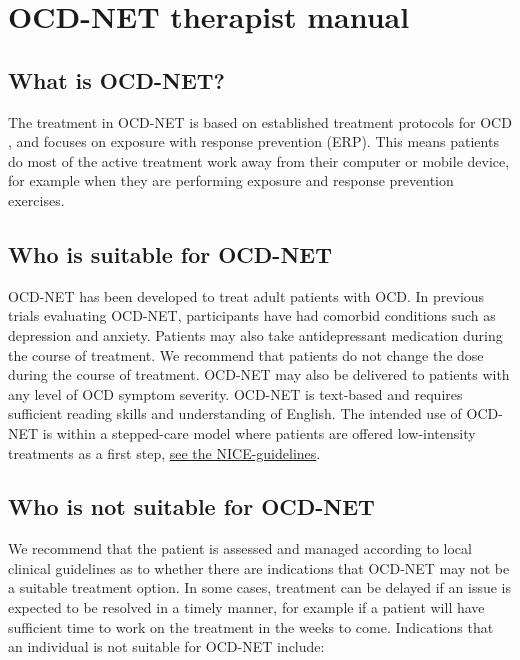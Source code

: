 \documentclass[]{book}
\begin{document}
\hypertarget{ocd-net-therapist-manual}{%
\chapter{OCD-NET therapist manual}\label{ocd-net-therapist-manual}}

\hypertarget{what-is-ocd-net}{%
\section{What is OCD-NET?}\label{what-is-ocd-net}}

The treatment in OCD-NET is based on established treatment protocols for OCD \citep{foa2012}, and focuses on exposure with response prevention (ERP). This means patients do most of the active treatment work away from their computer or mobile device, for example when they are performing exposure and response prevention exercises.

\hypertarget{who-is-suitable-for-ocd-net}{%
\section{Who is suitable for OCD-NET}\label{who-is-suitable-for-ocd-net}}

OCD-NET has been developed to treat adult patients with OCD. In previous trials evaluating OCD-NET, participants have had comorbid conditions such as depression and anxiety. Patients may also take antidepressant medication during the course of treatment. We recommend that patients do not change the dose during the course of treatment. OCD-NET may also be delivered to patients with any level of OCD symptom severity. OCD-NET is text-based and requires sufficient reading skills and understanding of English. The intended use of OCD-NET is within a stepped-care model where patients are offered low-intensity treatments as a first step, \href{https://www.nice.org.uk/guidance/CG31/chapter/1-Guidance\#stepped-care-for-adults-young-people-and-children-with-ocd-or-bdd}{see the NICE-guidelines}.

\hypertarget{who-is-not-suitable-for-ocd-net}{%
\section{Who is not suitable for OCD-NET}\label{who-is-not-suitable-for-ocd-net}}

We recommend that the patient is assessed and managed according to local clinical guidelines as to whether there are indications that OCD-NET may not be a suitable treatment option. In some cases, treatment can be delayed if an issue is expected to be resolved in a timely manner, for example if a patient will have sufficient time to work on the treatment in the weeks to come. Indications that an individual is not suitable for OCD-NET include:
\end{document}
